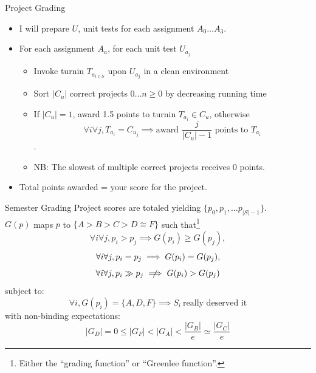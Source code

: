 \documentclass[handout]{beamer}
\begin{document}
\begin{frame}{Project Grading}
\begin{itemize}
\item I will prepare $U$, unit tests for each assignment $A_0 \dotsc A_3$.
\item For each assignment $A_a$, for each unit test $U_{a_j}$
\begin{itemize}
\item Invoke turnin $T_{a_{i \in S}}$ upon $U_{a_j}$ in a clean environment
\item Sort $|C_u|$ correct projects $0 \dotsc n\ge 0$ by decreasing running time
\item If $|C_u| = 1$, award 1.5 points to turnin $T_{a_i} \in C_u$, otherwise
\begin{equation}
\forall i \forall j, T_{a_i} = C_{u_j} \implies \text{award } \frac{j}{|C_u| - 1} \text{ points to } T_{a_i}
\nonumber
\end{equation}.
\item NB: The slowest of multiple correct projects receives 0 points.
\end{itemize}
\item Total points awarded = your score for the project.
\end{itemize}
\end{frame}

\begin{frame}{Semester Grading}
Project scores are totaled yielding $\{p_0, p_1, \dotsc p_{|S| - 1}\}$.\linebreak \\
$G(p)$ maps $p$ to $\{A > B > C > D \cong F\}$ such that\footnote{Either the ``grading function'' or ``Greenlee function''.}
\begin{equation}
\forall i \forall j, p_i > p_j \implies G(p_i) \ge G(p_j), \nonumber
\end{equation}
\begin{equation}
\forall i \forall j, p_i = p_j \implies G(p_i) = G(p_j), \nonumber \linebreak
\end{equation}
\begin{equation}
\forall i \forall j, p_i\gg p_j \centernot\implies G(p_i) > G(p_j) \nonumber
\end{equation}
subject to:
\begin{equation}
\forall i, G(p_i) = \{A, D, F\} \implies S_i\ \text{really deserved it}\nonumber
\end{equation}
with non-binding expectations:
\begin{equation}
|G_D| = 0 \le |G_F| < |G_A| < \frac{|G_B|}{e} \simeq \frac{|G_C|}{e} \nonumber
\end{equation}
\end{frame}
\end{document}
